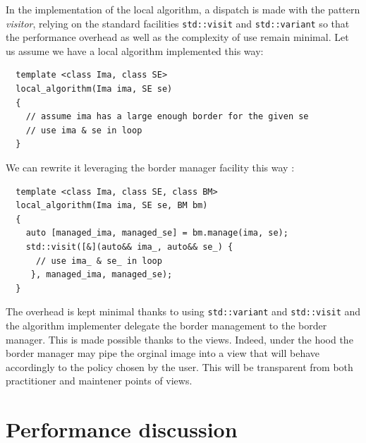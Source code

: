 In the implementation of the local algorithm, a dispatch is made with the pattern \emph{visitor}, relying on the
standard facilities \texttt{std::visit} and \texttt{std::variant} so that the performance overhead as well as the
complexity of use remain minimal. Let us assume we have a local algorithm implemented this way:
\begin{verbatim}
  template <class Ima, class SE>
  local_algorithm(Ima ima, SE se)
  {
    // assume ima has a large enough border for the given se
    // use ima & se in loop
  }
\end{verbatim}
We can rewrite it leveraging the border manager facility this way :
\begin{verbatim}
  template <class Ima, class SE, class BM>
  local_algorithm(Ima ima, SE se, BM bm)
  {
    auto [managed_ima, managed_se] = bm.manage(ima, se);
    std::visit([&](auto&& ima_, auto&& se_) { 
      // use ima_ & se_ in loop
     }, managed_ima, managed_se);
  }
\end{verbatim}
The overhead is kept minimal thanks to using \texttt{std::variant} and \texttt{std::visit} and the algorithm implementer
delegate the border management to the border manager. This is made possible thanks to the views. Indeed, under the hood
the border manager may pipe the orginal image into a view that will behave accordingly to the policy chosen by the user.
This will be transparent from both practitioner and maintener points of views.

\section{Performance discussion}

